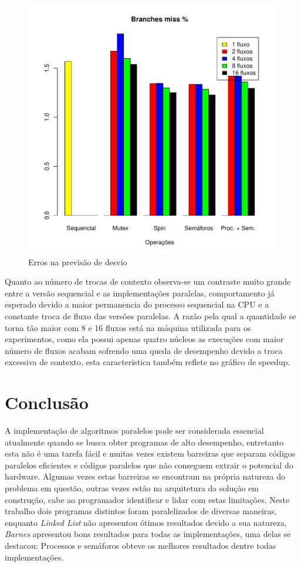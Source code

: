 \documentclass[12pt]{article}
\begin{document}
\begin{figure}[ht]
\centering
\includegraphics[width=.6\textwidth]{b_bm.pdf}
\caption{Erros na previsão de desvio}
\label{fig:desvios}
\end{figure}

Quanto ao número de trocas de contexto observa-se um contraste muito grande entre a versão sequencial e as implementações paralelas, comportamento já esperado devido a maior permanencia do processo sequencial na CPU e a constante troca de fluxo das versões paralelas. A razão pela qual a quantidade se torna tão maior com 8 e 16 fluxos está na máquina utilizada para os experimentos, como ela possui apenas quatro núcleos as execuções com maior número de fluxos acabam sofrendo uma queda de desempenho devido a troca excessiva de contexto, esta caracteristica também reflete no gráfico de speedup.

\section{Conclusão}
A implementação de algoritmos paralelos pode ser considerada essencial atualmente quando se busca obter programas de alto desempenho, entretanto esta não é uma tarefa fácil e muitas vezes existem barreiras que separam códigos paralelos eficientes e códigos paralelos que não conseguem extrair o potencial do hardware. Algumas vezes estas barreiras se encontram na própria natureza do problema em questão, outras vezes estão na arquitetura da solução em construção, cabe ao programador identificar e lidar com estas limitações. Neste trabalho dois programas distintos foram paralelizados de diversas maneiras, enquanto \textit{Linked List} não apresentou ótimos resultados devido a sua natureza, \textit{Barnes} apresentou bons resultados para todas as implementações, uma delas se destacou: Processos e semáforos obteve os melhores resultados dentre todas implementações. 



\end{document}
